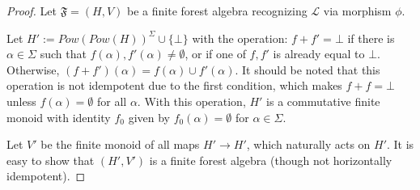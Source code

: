 \documentclass[sigplan,9pt]{acmart}\settopmatter{printfolios=true,printccs=false,printacmref=false}
\theoremstyle{definition}
\newcommand{\La}[0]{{\mathcal{L}}}
\newcommand{\Ff}[0]{{\mathfrak{F}}}
\begin{document}
\begin{proof}



Let $\Ff = (H,V)$ be a finite forest algebra recognizing $\La$ via morphism $\phi$. 


Let $H' := {Pow(Pow(H))}^\Sigma \cup \{\bot\}$ with the operation: $f + f' = \bot$ if there is $\alpha \in \Sigma$ such that $f(\alpha), f'(\alpha) \neq \emptyset$, or if one of $f, f'$ is already equal to $\bot$.
Otherwise, $(f+f')(\alpha) = f(\alpha) \cup f'(\alpha)$.
It should be noted that this operation is not idempotent due to the first condition, which makes $f + f = \bot$ unless $f(\alpha) = \emptyset$ for all $\alpha$.
With this operation, $H'$ is a commutative finite monoid with identity $f_0$ given by $f_0(\alpha) = \emptyset$ for $\alpha \in \Sigma$.

Let $V'$ be the finite monoid of all maps $H' \rightarrow H'$, which naturally acts on $H'$.
It is easy to show that $(H',V')$ is a finite forest algebra (though not horizontally idempotent).


\end{proof}
\end{document}
